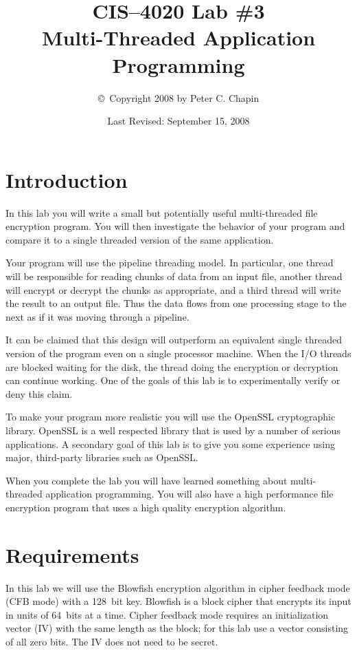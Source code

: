 \documentclass[twocolumn]{article}
\begin{document}
\title{CIS--4020 Lab \#3\\Multi-Threaded Application Programming}
\author{\copyright\ Copyright 2008 by Peter C. Chapin}
\date{Last Revised: September 15, 2008}
\maketitle

\section{Introduction}

In this lab you will write a small but potentially useful multi-threaded file encryption
program. You will then investigate the behavior of your program and compare it to a single
threaded version of the same application.

Your program will use the pipeline threading model. In particular, one thread will be
responsible for reading chunks of data from an input file, another thread will encrypt or
decrypt the chunks as appropriate, and a third thread will write the result to an output file.
Thus the data flows from one processing stage to the next as if it was moving through a
pipeline.

It can be claimed that this design will outperform an equivalent single threaded version of the
program even on a single processor machine. When the I/O threads are blocked waiting for the
disk, the thread doing the encryption or decryption can continue working. One of the goals of
this lab is to experimentally verify or deny this claim.

To make your program more realistic you will use the OpenSSL cryptographic library. OpenSSL is a
well respected library that is used by a number of serious applications. A secondary goal of
this lab is to give you some experience using major, third-party libraries such as OpenSSL.

When you complete the lab you will have learned something about multi-threaded application
programming. You will also have a high performance file encryption program that uses a high
quality encryption algorithm.

\section{Requirements}

In this lab we will use the Blowfish encryption algorithm in cipher feedback mode (CFB mode)
with a 128~bit key. Blowfish is a block cipher that encrypts its input in units of 64~bits at a
time. Cipher feedback mode requires an initialization vector (IV) with the same length as the
block; for this lab use a vector consisting of all zero bits. The IV does not need to be secret.
\end{document}

